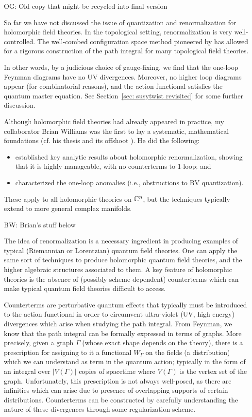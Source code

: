 \documentclass[11pt]{amsart}
\def\brian#1{{\textcolor{blue!75!red}{BW: {#1}}}}
\def\owen#1{{\textcolor{violet!50!black}{OG: {#1}}}}
\begin{document}
\owen{Old copy that might be recycled into final version}

So far we have not discussed the issue of quantization and renormalization for holomorphic field theories.
In the topological setting, renormalization is very well-controlled.
The well-combed configuration space method pioneered by \cite{} has allowed for a rigorous construction of the path integral for many topological field theories. 


In other words, by a judicious choice of gauge-fixing, 
we find that the one-loop Feynman diagrams have no UV divergences.
Moreover, no higher loop diagrams appear (for combinatorial reasons),
and the action functional satisfies the quantum master equation.
See Section~\ref{sec: susytwist revisited} for some further discussion.

Although holomorphic field theories had already appeared in practice,
my collaborator Brian Williams was the first to lay a systematic, mathematical foundations (cf. his thesis \cite{BWthesis} and its offshoot \cite{BWhol}).
He did the following:
\begin{itemize}
\item established key analytic results about holomorphic renormalization, 
showing that it is highly manageable, with no counterterms to 1-loop; and
\item characterized the one-loop anomalies  (i.e., obstructions to BV quantization).
\end{itemize}
These apply to all holomorphic theories on $\mathbb C^n$,
but the techniques typically extend to more general complex manifolds.

\brian{Brian's stuff below}

The idea of renormalization is a necessary ingredient in producing examples of typical (Riemannian or Lorentzian) quantum field theories.
One can apply the same sort of techniques to produce holomorphic quantum field theories, and the higher algebraic structures associated to them.
A key feature of holomorphic theories is the absence of (possibly scheme-dependent) counterterms which can make typical quantum field theories difficult to access.

Counterterms are perturbative quantum effects that typically must be introduced to the action functional in order to circumvent ultra-violet (UV, high energy) divergences which arise when studying the path integral.
From Feynman, we know that the path integral can be formally expressed in terms of graphs. 
More precisely, given a graph $\Gamma$ (whose exact shape depends on the theory), there is a prescription for assigning to it a functional $W_\Gamma$ on the fields (a distribution) which we can understand as term in the quantum action; typically in the form of an integral over $|V(\Gamma)|$ copies of spacetime where $V(\Gamma)$ is the vertex set of the graph.
Unfortunately, this prescription is not always well-posed, as there are infinities which can arise due to presence of overlapping supports of certain distributions.
Counterterms can be constructed by carefully understanding the nature of these divergences through some regularization scheme.
\end{document}
